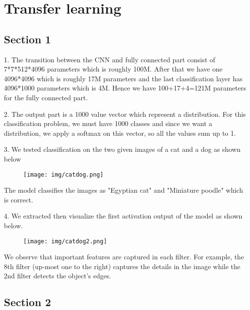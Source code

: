
\section{Transfer learning}

\subsection{Section 1}

1. The transition between the CNN and fully connected part consist of 7*7*512*4096 parameters which is roughly 100M. After that we have one 4096*4096 which is roughly 17M parameters and the last classification layer has 4096*1000 parameters which is 4M. Hence we have 100+17+4=121M parameters for the fully connected part.

2. The output part is a 1000 value vector which represent a distribution. For this classification problem, we must have 1000 classes and since we want a distribution, we apply a softmax on this vector, so all the values sum up to 1.

3. We tested classification on the two given images of a cat and a dog as shown below
\begin{figure}[H]
  \centering
    \texttt{[image: img/catdog.png]}
\end{figure}
The model classifies the images as "Egyptian cat" and "Miniature poodle" which is correct.

4. We extracted then visualize the first activation output of the model as shown below.
\begin{figure}[H]
  \centering
    \texttt{[image: img/catdog2.png]}
\end{figure}
We observe that important features are captured in each filter. For example, the 8th filter (up-most one to the right) captures the details in the image while the 2nd filter detects the object's edges.

\subsection{Section 2}

